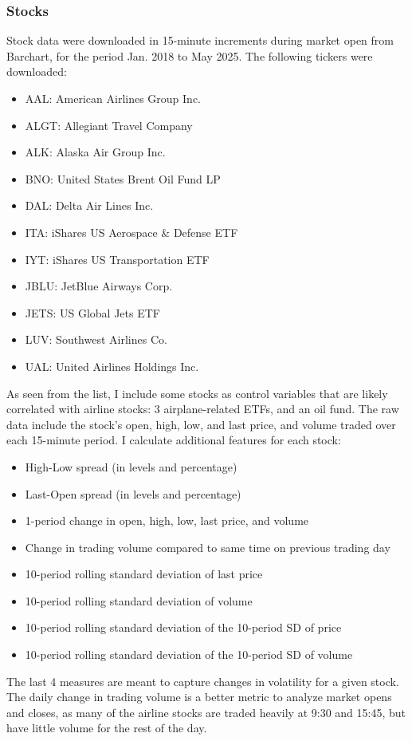 \documentclass[12pt]{article}
\begin{document}
\subsubsection{Stocks}
Stock data were downloaded in 15-minute increments during market open from Barchart, for the period Jan. 2018 to May 2025. The following tickers were downloaded:
\begin{itemize}
\singlespacing
    \item AAL: American Airlines Group Inc.
    \item ALGT: Allegiant Travel Company
    \item ALK: Alaska Air Group Inc.
    \item BNO: United States Brent Oil Fund LP
    \item DAL: Delta Air Lines Inc.
    \item ITA: iShares US Aerospace \& Defense ETF
    \item IYT: iShares US Transportation ETF
    \item JBLU: JetBlue Airways Corp.
    \item JETS: US Global Jets ETF
    \item LUV: Southwest Airlines Co.
    \item UAL: United Airlines Holdings Inc.
\end{itemize}
As seen from the list, I include some stocks as control variables that are likely correlated with airline stocks: 3 airplane-related ETFs, and an oil fund. The raw data include the stock's open, high, low, and last price, and volume traded over each 15-minute period. I calculate additional features for each stock:
\begin{itemize}
\singlespacing
    \item High-Low spread (in levels and percentage)
    \item Last-Open spread (in levels and percentage)
    \item 1-period change in open, high, low, last price, and volume
    \item Change in trading volume compared to same time on previous trading day
    \item 10-period rolling standard deviation of last price
    \item 10-period rolling standard deviation of volume
    \item 10-period rolling standard deviation of the 10-period SD of price
    \item 10-period rolling standard deviation of the 10-period SD of volume
\end{itemize}
The last 4 measures are meant to capture changes in volatility for a given stock. The daily change in trading volume is a better metric to analyze market opens and closes, as many of the airline stocks are traded heavily at 9:30 and 15:45, but have little volume for the rest of the day. 
\end{document}
